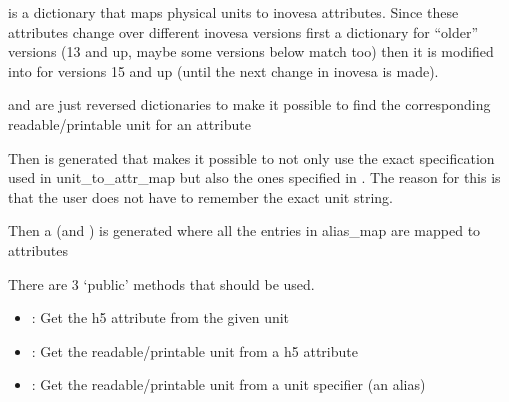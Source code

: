 \documentclass[letterpaper,10pt,openany,oneside,english]{sphinxmanual}
\begin{document}
 is a dictionary that maps physical units to inovesa attributes.  
Since these attributes change over different inovesa versions first a dictionary for “older”  
versions (13 and up, maybe some versions below match too) then it is modified into  
 for versions 15 and up (until the next change in inovesa is made).

 and  are just reversed dictionaries to make it possible  
to find the corresponding readable/printable unit for an attribute

Then  is generated that makes it possible to not only use the exact specification  
used in unit\_to\_attr\_map but also the ones specified in . The reason for this is  
that the user does not have to remember the exact unit string.

Then a  (and ) is generated where all the entries in  
alias\_map are mapped to attributes

There are 3 ‘public’ methods that should be used.
\begin{itemize}
\item {} 
: Get the h5 attribute from the given unit

\item {} 
: Get the readable/printable unit from a h5 attribute

\item {} 
: Get the readable/printable unit from a unit specifier (an alias)

\end{itemize}

\begin{fulllineitems}
\label{\detokenize{utils:utils.UnitError}}
\end{fulllineitems}


\begin{fulllineitems}
\label{\detokenize{utils:utils.DataNotInFile}}
\end{fulllineitems}
\end{document}
